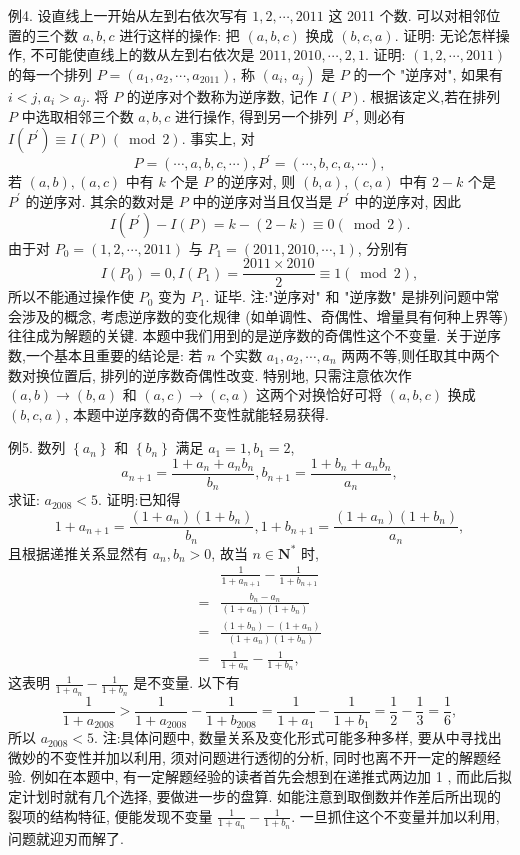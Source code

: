 例4. 设直线上一开始从左到右依次写有 $1,2, \cdots, 2011$ 这 2011 个数.
可以对相邻位置的三个数 $a, b, c$ 进行这样的操作: 把 $(a, b, c)$ 换成 $(b, c, a)$. 证明: 无论怎样操作, 不可能使直线上的数从左到右依次是 $2011,2010, \cdots, 2,1$.
证明: $(1,2, \cdots, 2011)$ 的每一个排列 $P=\left(a_1, a_2, \cdots, a_{2011}\right)$, 称 $\left(a_i\right.$, $\left.a_j\right)$ 是 $P$ 的一个 "逆序对", 如果有 $i<j, a_i>a_j$. 将 $P$ 的逆序对个数称为逆序数, 记作 $I(P)$.
根据该定义,若在排列 $P$ 中选取相邻三个数 $a, b, c$ 进行操作, 得到另一个排列 $P^{\prime}$, 则必有 $I\left(P^{\prime}\right) \equiv I(P)(\bmod 2)$. 事实上, 对
$$
P=(\cdots, a, b, c, \cdots), P^{\prime}=(\cdots, b, c, a, \cdots),
$$
若 $(a, b),(a, c)$ 中有 $k$ 个是 $P$ 的逆序对, 则 $(b, a),(c, a)$ 中有 $2-k$ 个是 $P^{\prime}$ 的逆序对.
其余的数对是 $P$ 中的逆序对当且仅当是 $P^{\prime}$ 中的逆序对, 因此
$$
I\left(P^{\prime}\right)-I(P)=k-(2-k) \equiv 0(\bmod 2) .
$$
由于对 $P_0=(1,2, \cdots, 2011)$ 与 $P_1=(2011,2010, \cdots, 1)$, 分别有
$$
I\left(P_0\right)=0, I\left(P_1\right)=\frac{2011 \times 2010}{2} \equiv 1(\bmod 2),
$$
所以不能通过操作使 $P_0$ 变为 $P_1$. 证毕.
注:"逆序对" 和 "逆序数" 是排列问题中常会涉及的概念, 考虑逆序数的变化规律 (如单调性、奇偶性、增量具有何种上界等) 往往成为解题的关键.
本题中我们用到的是逆序数的奇偶性这个不变量.
关于逆序数,一个基本且重要的结论是: 若 $n$ 个实数 $a_1, a_2, \cdots, a_n$ 两两不等,则任取其中两个数对换位置后, 排列的逆序数奇偶性改变.
特别地, 只需注意依次作 $(a, b) \rightarrow(b, a)$ 和 $(a, c) \rightarrow(c, a)$ 这两个对换恰好可将 $(a, b, c)$ 换成 $(b, c, a)$, 本题中逆序数的奇偶不变性就能轻易获得.



例5. 数列 $\left\{a_n\right\}$ 和 $\left\{b_n\right\}$ 满足 $a_1=1, b_1=2$,
$$
a_{n+1}=\frac{1+a_n+a_n b_n}{b_n}, b_{n+1}=\frac{1+b_n+a_n b_n}{a_n},
$$
求证: $a_{2008}<5$. 
证明:已知得
$$
1+a_{n+1}=\frac{\left(1+a_n\right)\left(1+b_n\right)}{b_n}, 1+b_{n+1}=\frac{\left(1+a_n\right)\left(1+b_n\right)}{a_n},
$$
且根据递推关系显然有 $a_n, b_n>0$, 故当 $n \in \mathbf{N}^*$ 时,
$$
\begin{aligned}
& \frac{1}{1+a_{n+1}}-\frac{1}{1+b_{n+1}} \\
= & \frac{b_n-a_n}{\left(1+a_n\right)\left(1+b_n\right)} \\
= & \frac{\left(1+b_n\right)-\left(1+a_n\right)}{\left(1+a_n\right)\left(1+b_n\right)} \\
= & \frac{1}{1+a_n}-\frac{1}{1+b_n},
\end{aligned}
$$
这表明 $\frac{1}{1+a_n}-\frac{1}{1+b_n}$ 是不变量.
以下有
$$
\frac{1}{1+a_{2008}}>\frac{1}{1+a_{2008}}-\frac{1}{1+b_{2008}}=\frac{1}{1+a_1}-\frac{1}{1+b_1}=\frac{1}{2}-\frac{1}{3}=\frac{1}{6},
$$
所以 $a_{2008}<5$.
注:具体问题中, 数量关系及变化形式可能多种多样, 要从中寻找出微妙的不变性并加以利用, 须对问题进行透彻的分析, 同时也离不开一定的解题经验.
例如在本题中, 有一定解题经验的读者首先会想到在递推式两边加 1 , 而此后拟定计划时就有几个选择, 要做进一步的盘算.
如能注意到取倒数并作差后所出现的裂项的结构特征, 便能发现不变量 $\frac{1}{1+a_n}-\frac{1}{1+b_n}$. 一旦抓住这个不变量并加以利用, 问题就迎刃而解了.



